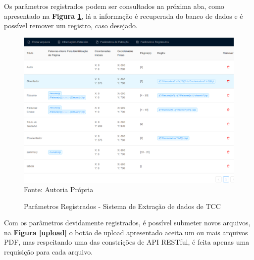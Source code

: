 

Os parâmetros registrados podem ser consultados na próxima aba, como apresentado na \textbf{Figura \ref{paramsR}}, lá a informação é recuperada do banco de dados e é possível remover um registro, caso desejado.

\begin{figure}[H]
\centering
\captionsetup{justification   = raggedright,
              singlelinecheck = false}
\caption{Parâmetros Registrados - Sistema de Extração de dados de TCC}\label{paramsR}
\includegraphics[width=1\textwidth]{figs/tccExtract/paramsR2.png}
\footnotesize Fonte: Autoria Própria
\end{figure}

Com os parâmetros devidamente registrados, é possível submeter novos arquivos, na \textbf{Figura \ref{upload}} o botão de upload apresentado aceita um ou mais arquivos PDF, mas respeitando uma das constrições de API RESTful, é feita apenas uma requisição para cada arquivo.

